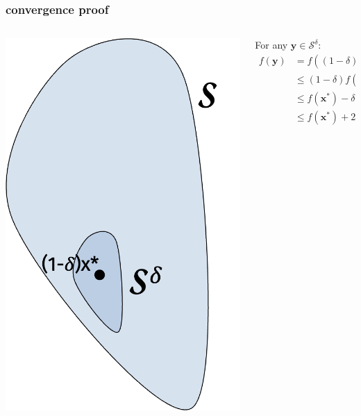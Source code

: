 \documentclass[compress]{beamer}
\newcommand{\bv}[1]{\mathbf{#1}}
\begin{document}
\begin{frame}
	\frametitle{convergence proof}
	\begin{columns}
		\begin{column}{.3\textwidth}
		\includegraphics[width=\textwidth]{smallbody.png}
		\end{column}
		\begin{column}{.7\textwidth}
		For any $\bv{y} \in \mathcal{S}^\delta$:	
		\begin{align*}
			f(\bv{y}) &= f\left((1-\delta)\bv{x}^* + \delta \bv{x}\right) \\
			&\leq (1-\delta) f(\bv{x}^*) + \delta f(\bv{x})\\
			& \leq f(\bv{x}^*) - \delta f(\bv{x}^*)  + \delta f(\bv{x})\\
			&\leq f(\bv{x}^*)  + 2B\delta.
		\end{align*}
	\end{column}
	\end{columns}
\end{frame}
\end{document}
